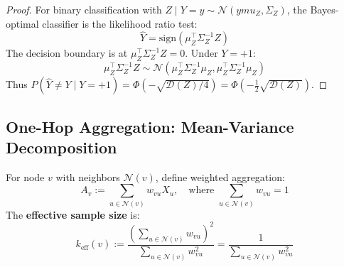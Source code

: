 \begin{proof}
For binary classification with $Z \mid Y = y \sim \mathcal{N}(ymu_Z, \Sigma_Z)$, the Bayes-optimal classifier is the likelihood ratio test:
\begin{equation}
    \hat{Y} = \mathrm{sign}\left(\mu_Z^\top \Sigma_Z^{-1} Z\right)
\end{equation}
The decision boundary is at $\mu_Z^\top \Sigma_Z^{-1} Z = 0$. Under $Y = +1$:
\begin{equation}
    \mu_Z^\top \Sigma_Z^{-1} Z \sim \mathcal{N}\left(\mu_Z^\top \Sigma_Z^{-1} \mu_Z, \mu_Z^\top \Sigma_Z^{-1} \mu_Z\right)
\end{equation}
Thus $P(\hat{Y} \neq Y \mid Y = +1) = \Phi(-\sqrt{\mathcal{D}(Z)/4}) = \Phi(-\frac{1}{2}\sqrt{\mathcal{D}(Z)})$.
\end{proof}

\subsection{One-Hop Aggregation: Mean-Variance Decomposition}
\label{subsec:one_hop_rigorous}

\begin{definition}
\label{def:weighted_agg}
For node $v$ with neighbors $\mathcal{N}(v)$, define weighted aggregation:
\begin{equation}
    A_v := \sum_{u \in \mathcal{N}(v)} w_{vu} X_u, \quad \text{where } \sum_{u \in \mathcal{N}(v)} w_{vu} = 1
\end{equation}
The \textbf{effective sample size} is:
\begin{equation}
    k_{\mathrm{eff}}(v) := \frac{\left(\sum_{u \in \mathcal{N}(v)} w_{vu}\right)^2}{\sum_{u \in \mathcal{N}(v)} w_{vu}^2} = \frac{1}{\sum_{u \in \mathcal{N}(v)} w_{vu}^2}
\end{equation}
\end{definition}

